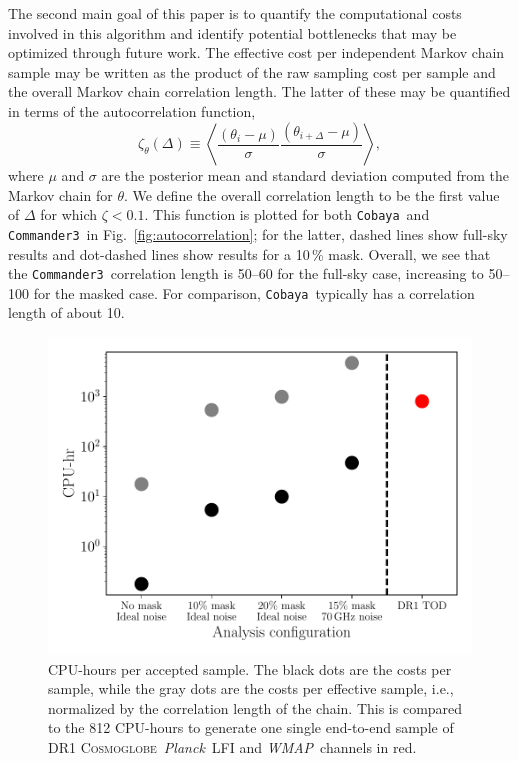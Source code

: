 \documentclass[twocolumn]{../common/aa}
\def\wmap{\emph{WMAP}}
\def\planck{\emph{Planck}}
\def\commanderthree{\texttt{Commander3}}
\def\cobaya{\texttt{Cobaya}}
\newcommand{\cosmoglobe}{\textsc{Cosmoglobe}}
\begin{document}
The second main goal of this paper is to quantify the computational costs involved in this algorithm and identify potential bottlenecks that may be optimized through future work. The effective cost per independent Markov chain sample may be written as the product of the raw sampling cost per sample and the overall Markov chain correlation length. The latter of these may be quantified in terms of the autocorrelation function,
\begin{equation}
  \zeta_\theta(\Delta) \equiv \left<\frac{(\theta_i - \mu)}{\sigma}\frac{(\theta_{i+\Delta} - \mu)}{\sigma}\right>,
\end{equation}
where $\mu$ and $\sigma$ are the posterior mean and standard deviation computed from the Markov chain for $\theta$. We define the overall correlation length to be the first value of $\Delta$ for which $\zeta < 0.1$. This function is plotted for both \cobaya\ and \commanderthree\ in Fig.~\ref{fig:autocorrelation}; for the latter, dashed lines show full-sky results and dot-dashed lines show results for a 10\,\% mask. Overall, we see that the \commanderthree\ correlation length is 50--60 for the full-sky case, increasing to 50--100 for the masked case. For comparison, \cobaya\ typically has a correlation length of about 10.

\begin{figure}
	\centering
	\includegraphics[width=\linewidth]{figures/run_time.pdf}
	\caption{\label{fig:runtime}CPU-hours per accepted sample. The black dots are the costs per sample, while the gray dots are the costs per effective sample, i.e., normalized by the correlation length of the chain. This is compared to the 812 CPU-hours to generate one single end-to-end sample of DR1  \cosmoglobe\ \planck\ LFI and \wmap\ channels in red.}
\end{figure}
\end{document}
